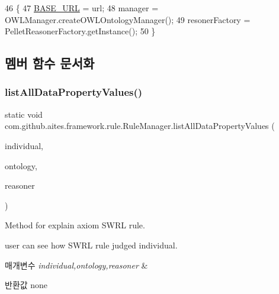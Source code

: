\begin{DoxyCode}
46                                   \{
47         \mbox{\hyperlink{classcom_1_1github_1_1aites_1_1framework_1_1rule_1_1_rule_manager_ac1b9ec84300caaf946326a6c6aa479de}{BASE\_URL}} = url;
48         manager = OWLManager.createOWLOntologyManager();
49         resonerFactory = PelletReasonerFactory.getInstance();
50     \}
\end{DoxyCode}


\subsection{멤버 함수 문서화}
\mbox{\label{classcom_1_1github_1_1aites_1_1framework_1_1rule_1_1_rule_manager_a941721d9a39297d18a1698016dda6e05}} 
\subsubsection{\texorpdfstring{list\+All\+Data\+Property\+Values()}{listAllDataPropertyValues()}}
{\footnotesize\ttfamily static void com.\+github.\+aites.\+framework.\+rule.\+Rule\+Manager.\+list\+All\+Data\+Property\+Values (\begin{DoxyParamCaption}\item[{O\+W\+L\+Named\+Individual}]{individual,  }\item[{O\+W\+L\+Ontology}]{ontology,  }\item[{O\+W\+L\+Reasoner}]{reasoner }\end{DoxyParamCaption})\hspace{0.3cm}{\ttfamily [static]}}



Method for explain axiom S\+W\+RL rule. 

user can see how S\+W\+RL rule judged individual. 
\begin{DoxyParams}{매개변수}
{\em individual,ontology,reasoner} & \\
\hline
\end{DoxyParams}
\begin{DoxyReturn}{반환값}
none 
\end{DoxyReturn}


